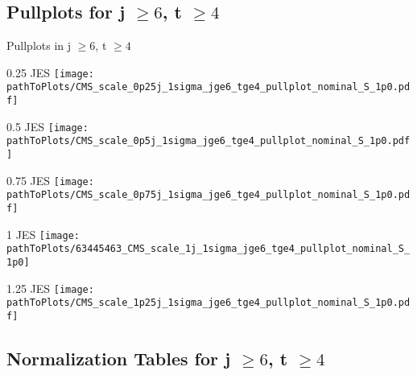 \subsection{Pullplots for j $\geq 6$, t $\geq 4$}
\begin{frame}{Pullplots in j $\geq 6$, t $\geq 4$}
\begin{minipage}{0.25\textwidth}
\begin{block}{\num{0.25} JES}
\texttt{[image: \\pathToPlots/CMS\_scale\_0p25j\_1sigma\_jge6\_tge4\_pullplot\_nominal\_S\_1p0.pdf]}\\
\end{block}

\end{minipage}
\hfill
\begin{minipage}{0.25\textwidth}
\begin{block}{\num{0.5} JES}
\texttt{[image: \\pathToPlots/CMS\_scale\_0p5j\_1sigma\_jge6\_tge4\_pullplot\_nominal\_S\_1p0.pdf]}\\
\end{block}

\end{minipage}
\hfill
\begin{minipage}{0.25\textwidth}
\begin{block}{\num{0.75} JES}
\texttt{[image: \\pathToPlots/CMS\_scale\_0p75j\_1sigma\_jge6\_tge4\_pullplot\_nominal\_S\_1p0.pdf]}\\
\end{block}
\end{minipage}
\hfill

\begin{minipage}{0.25\textwidth}
\begin{block}{1 JES}
\texttt{[image: \\pathToPlots/63445463\_CMS\_scale\_1j\_1sigma\_jge6\_tge4\_pullplot\_nominal\_S\_1p0]}\\
\end{block}

\end{minipage}
\hfill
\begin{minipage}{0.25\textwidth}
\begin{block}{\num{1.25} JES}
\texttt{[image: \\pathToPlots/CMS\_scale\_1p25j\_1sigma\_jge6\_tge4\_pullplot\_nominal\_S\_1p0.pdf]}\\
\end{block}
\end{minipage}
\end{frame}

\subsection{Normalization Tables for j $\geq 6$, t $\geq 4$}

